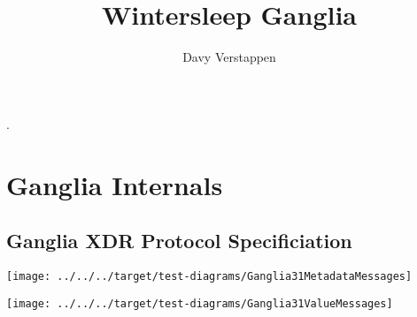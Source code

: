 \documentclass[11pt,a4paper]{report}
\author{Davy Verstappen}
\title{Wintersleep Ganglia}
\begin{document}
.
\maketitle
\tableofcontents
\chapter{Ganglia Internals}

\section{Ganglia XDR Protocol Specificiation}


\texttt{[image: ../../../target/test-diagrams/Ganglia31MetadataMessages]}

\newpage

\texttt{[image: ../../../target/test-diagrams/Ganglia31ValueMessages]}


\end{document}
